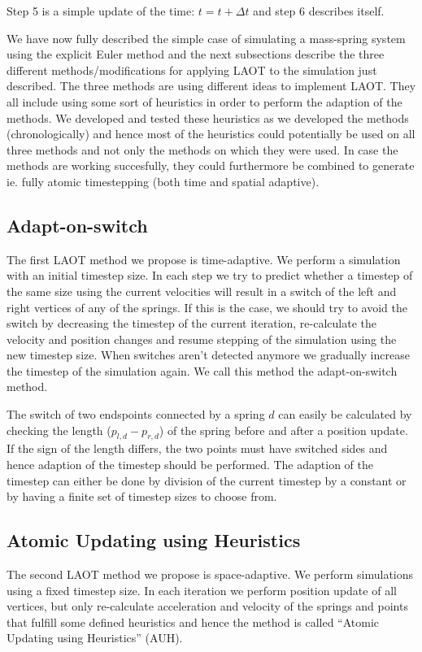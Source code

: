 \documentclass[11pt]{article}
\begin{document}
Step 5 is a simple update of the time: $t = t + \Delta t$ and step 6 describes
itself.

We have now fully described the simple case of simulating a mass-spring system
using the explicit Euler method and the next subsections describe the three
different methods/modifications for applying LAOT to the simulation just
described. The three methods are using different ideas to implement LAOT. They
all include using some sort of heuristics in order to perform the adaption of
the methods. We developed and tested these heuristics as we developed the
methods (chronologically) and hence most of the heuristics could potentially be
used on all three methods and not only the methods on which they were used. In
case the methods are working succesfully, they could furthermore be combined to
generate ie. fully atomic timestepping (both time and spatial adaptive).

\subsection{Adapt-on-switch}
\label{sec:method_switch}
The first LAOT method we propose is time-adaptive. We perform a simulation
with an initial timestep size. In each step we try to predict whether a timestep
of the same size using the current velocities will result in a switch of the
left and right vertices of any of the springs. If this is the case, we should
try to avoid the switch by decreasing the timestep of the current iteration,
re-calculate the velocity and position changes and resume stepping of the
simulation using the new timestep size. When switches aren't detected anymore
we gradually increase the timestep of the simulation again. We call this
method the adapt-on-switch method.

The switch of two endspoints connected by a spring $d$ can easily be
calculated by checking the length ($p_{l,d} - p_{r,d}$) of the spring before
and after a position update. If the sign of the length differs, the two
points must have switched sides and hence adaption of the timestep should be
performed. The adaption of the timestep can either be done by division of the
current timestep by a constant or by having a finite set of timestep sizes to
choose from.

\subsection{Atomic Updating using Heuristics}
The second LAOT method we propose is space-adaptive. We perform simulations
using a fixed timestep size. In each iteration we perform position update of
all vertices, but only re-calculate acceleration and velocity of the springs
and points that fulfill some defined heuristics and hence the method is called
``Atomic Updating using Heuristics'' (AUH).
\end{document}
